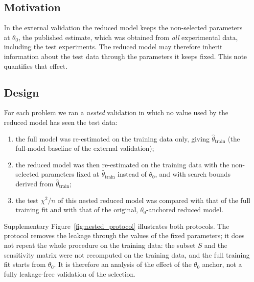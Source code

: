 
\subsection*{Motivation}

In the external validation the reduced model keeps the non-selected parameters at $\theta_0$, the published estimate, which was obtained from \emph{all} experimental data, including the test experiments. The reduced model may therefore inherit information about the test data through the parameters it keeps fixed. This note quantifies that effect.

\subsection*{Design}

For each problem we ran a \emph{nested} validation in which no value used by the reduced model has seen the test data:
\begin{enumerate}\itemsep0pt
  \item the full model was re-estimated on the training data only, giving $\hat\theta_{\mathrm{train}}$ (the full-model baseline of the external validation);
  \item the reduced model was then re-estimated on the training data with the non-selected parameters fixed at $\hat\theta_{\mathrm{train}}$ instead of $\theta_0$, and with search bounds derived from $\hat\theta_{\mathrm{train}}$;
  \item the test $\chi^2/n$ of this nested reduced model was compared with that of the full training fit and with that of the original, $\theta_0$-anchored reduced model.
\end{enumerate}
Supplementary Figure~\ref{fig:nested_protocol} illustrates both protocols. The protocol removes the leakage through the values of the fixed parameters; it does not repeat the whole procedure on the training data: the subset $S$ and the sensitivity matrix were not recomputed on the training data, and the full training fit starts from $\theta_0$. It is therefore an analysis of the effect of the $\theta_0$ anchor, not a fully leakage-free validation of the selection.

